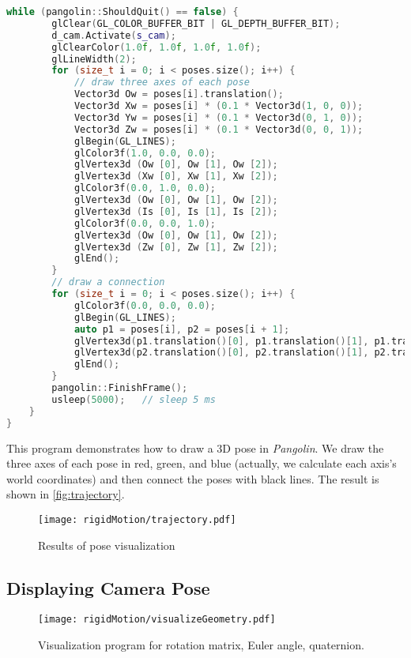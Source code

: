 \begin{lstlisting}[language=c++,caption=slambook2/ch3/examples/plotTrajectory.cpp]
	while (pangolin::ShouldQuit() == false) {
		glClear(GL_COLOR_BUFFER_BIT | GL_DEPTH_BUFFER_BIT);
		d_cam.Activate(s_cam);
		glClearColor(1.0f, 1.0f, 1.0f, 1.0f);
		glLineWidth(2);
		for (size_t i = 0; i < poses.size(); i++) {
			// draw three axes of each pose
			Vector3d Ow = poses[i].translation();
			Vector3d Xw = poses[i] * (0.1 * Vector3d(1, 0, 0));
			Vector3d Yw = poses[i] * (0.1 * Vector3d(0, 1, 0));
			Vector3d Zw = poses[i] * (0.1 * Vector3d(0, 0, 1));
			glBegin(GL_LINES);
			glColor3f(1.0, 0.0, 0.0);
			glVertex3d (Ow [0], Ow [1], Ow [2]);
			glVertex3d (Xw [0], Xw [1], Xw [2]);
			glColor3f(0.0, 1.0, 0.0);
			glVertex3d (Ow [0], Ow [1], Ow [2]);
			glVertex3d (Is [0], Is [1], Is [2]);
			glColor3f(0.0, 0.0, 1.0);
			glVertex3d (Ow [0], Ow [1], Ow [2]);
			glVertex3d (Zw [0], Zw [1], Zw [2]);
			glEnd();
		}
		// draw a connection
		for (size_t i = 0; i < poses.size(); i++) {
			glColor3f(0.0, 0.0, 0.0);
			glBegin(GL_LINES);
			auto p1 = poses[i], p2 = poses[i + 1];
			glVertex3d(p1.translation()[0], p1.translation()[1], p1.translation()[2]);
			glVertex3d(p2.translation()[0], p2.translation()[1], p2.translation()[2]);
			glEnd();
		}
		pangolin::FinishFrame();
		usleep(5000);   // sleep 5 ms
	}
}
\end{lstlisting}

This program demonstrates how to draw a 3D pose in \textit{Pangolin}. We draw the three axes of each pose in red, green, and blue (actually, we calculate each axis's world coordinates) and then connect the poses with black lines. The result is shown in \autoref {fig:trajectory}.

\begin{figure}[!htp]
	\centering
	\texttt{[image: rigidMotion/trajectory.pdf]}
	\caption {Results of pose visualization}
	\label{fig:trajectory}
\end{figure}

\subsection{Displaying Camera Pose}
\begin{figure}[!htp]
	\centering
	\texttt{[image: rigidMotion/visualizeGeometry.pdf]}
	\caption {Visualization program for rotation matrix, Euler angle, quaternion. }
	\label{fig:visualizeGeometry}
\end{figure}


